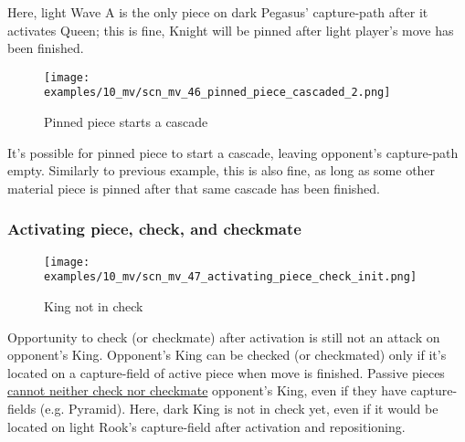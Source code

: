 Here, light Wave A is the only piece on dark Pegasus' capture-path after it activates
Queen; this is fine, Knight will be pinned after light player's move has been finished.

\clearpage %

\vspace*{-2.3\baselineskip}
\noindent
\begin{figure}[!h]
\texttt{[image: examples/10\_mv/scn\_mv\_46\_pinned\_piece\_cascaded\_2.png]}
\caption{Pinned piece starts a cascade}
\label{fig:scn_mv_46_pinned_piece_cascaded_2}
\end{figure}

It's possible for pinned piece to start a cascade, leaving opponent's capture-path
empty. Similarly to previous example, this is also fine, as long as some other
material piece is pinned after that same cascade has been finished.

\clearpage %

\subsubsection*{Activating piece, check, and checkmate}
\label{sec:Miranda's veil/Wave/Cascading Waves/Activating piece, check, and checkmate}

\vspace*{-0.7\baselineskip}
\noindent
\begin{wrapfigure}[15]{l}{0.4\textwidth}
\centering
\texttt{[image: examples/10\_mv/scn\_mv\_47\_activating\_piece\_check\_init.png]}
\vspace*{-1.4\baselineskip}
\caption{King not in check}
\label{fig:scn_mv_47_activating_piece_check_init}
\end{wrapfigure}
Opportunity to check (or checkmate) after activation is still not
an attack on opponent's King. \newline
\indent
Opponent's King can be checked (or checkmated) only if it's located
on a capture-field of active piece when move is finished. \newline
\indent
Passive pieces
\hyperref[fig:scn_ma_19_pyramid_vs_king]{cannot neither check nor checkmate}
opponent's King, even if they have capture-fields (e.g. Pyramid). \newline
\indent
Here, dark King is not in check yet, even if it would be located on light
Rook's capture-field after activation and repositioning.

